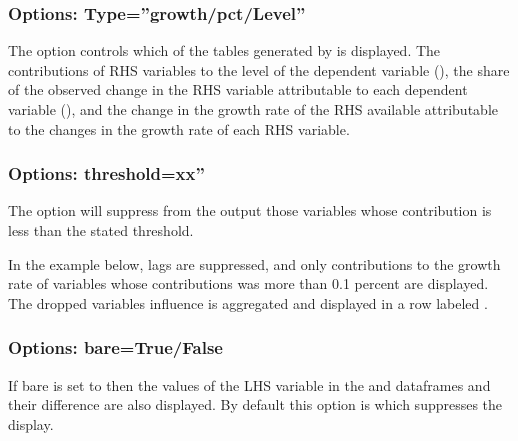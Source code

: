 \documentclass[letterpaper,10pt,english]{jupyterBook}
\begin{document}
\subsubsection{Options: Type=”growth/pct/Level”}
\label{\detokenize{content/06_ModelAnalytics/AttributionSomeFeatures:options-type-growth-pct-level}}
\sphinxAtStartPar
The option  controls which of the tables generated by  is displayed. The contributions of RHS variables to the level of the dependent variable (), the share of the observed change in the RHS variable attributable to each dependent variable (), and the change in the growth rate of the RHS available attributable to the changes in the growth rate of each RHS variable.


\subsubsection{Options: threshold=xx”}
\label{\detokenize{content/06_ModelAnalytics/AttributionSomeFeatures:options-threshold-xx}}
\sphinxAtStartPar
The  option will suppress from the output those variables whose contribution is less than the stated threshold.

\sphinxAtStartPar
In the example below, lags are suppressed, and only contributions to the growth rate of variables whose contributions was more than 0.1 percent are displayed.  The dropped variables influence is aggregated and displayed in a row labeled .


\subsubsection{Options: bare=True/False}
\label{\detokenize{content/06_ModelAnalytics/AttributionSomeFeatures:options-bare-true-false}}
\sphinxAtStartPar
If bare is set to  then the values of the LHS variable in the  and  dataframes and their difference are also displayed. By default this option is  which suppresses the display.
\end{document}
